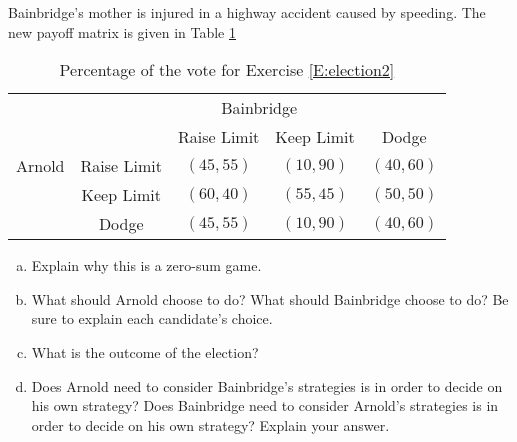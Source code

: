 \begin{xca}\label{E:election2}
Bainbridge's mother is injured in a highway accident caused by speeding. The new payoff matrix is given in Table \ref{T:election2}



\begin{table}[h]
\centering

\begin{tabular}{ccccc}
                      & \multicolumn{4}{c}{Bainbridge}                                                  \\ \cline{2-5} 
\multicolumn{1}{l|}{} & \multicolumn{1}{l|}{} & \multicolumn{1}{c|}{Raise Limit} & \multicolumn{1}{c|}{Keep Limit} & \multicolumn{1}{c|}{Dodge}\\ \cline{2-5} 
\multicolumn{1}{l|}{Arnold} & \multicolumn{1}{c|}{Raise Limit} & \multicolumn{1}{c|}{$(45, 55)$} & \multicolumn{1}{c|}{$(10, 90)$} & \multicolumn{1}{c|}{$(40, 60)$}\\ \cline{2-5} 
\multicolumn{1}{l|}{} & \multicolumn{1}{c|}{Keep Limit} & \multicolumn{1}{c|}{$(60, 40)$} & \multicolumn{1}{c|}{$(55, 45)$} & \multicolumn{1}{c|}{$(50, 50)$}\\ \cline{2-5} 
\multicolumn{1}{l|}{} & \multicolumn{1}{c|}{Dodge} & \multicolumn{1}{c|}{$(45, 55)$} & \multicolumn{1}{c|}{$(10, 90)$} & \multicolumn{1}{c|}{$(40, 60)$} \\ \cline{2-5} 
\end{tabular}
\caption{Percentage of the vote for Exercise \ref{E:election2}}
\label{T:election2}
\end{table}



\begin{enumerate}[(a)]
\item Explain why this is a zero-sum game.

\item What should Arnold choose to do? What should Bainbridge choose to do? Be sure to explain each candidate's choice.

\item What is the outcome of the election?
\item Does Arnold need to consider Bainbridge's strategies is in order to decide on his own strategy? Does Bainbridge need to consider Arnold's strategies is in order to decide on his own strategy? Explain your answer.

\end{enumerate}
\end{xca}
